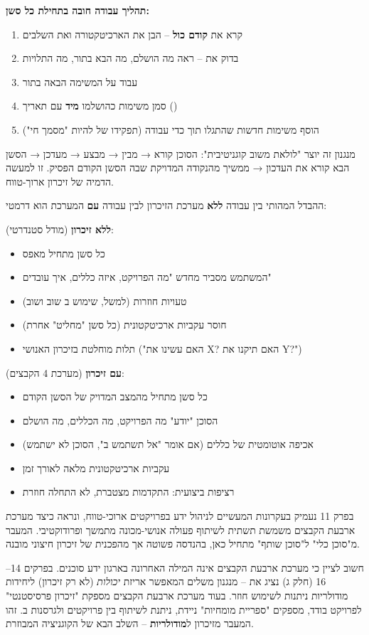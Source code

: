 \textbf{תהליך עבודה חובה בתחילת כל סשן:}
\begin{enumerate}
  \item קרא את  \textbf{קודם כול} – הבן את הארכיטקטורה ואת השלבים
  \item בדוק את  – ראה מה הושלם, מה הבא בתור, מה התלויות
  \item עבוד על המשימה הבאה בתור
  \item סמן משימות כהושלמו \textbf{מיד} עם תאריך ()
  \item הוסף משימות חדשות שהתגלו תוך כדי עבודה (תפקידו של  להיות "מסמך חי")
\end{enumerate}

מנגנון זה יוצר "לולאת משוב קוגניטיבית": הסוכן קורא → מבין → מבצע → מעדכן → הסשן הבא קורא את העדכון → ממשיך מהנקודה המדויקת שבה הסשן הקודם הפסיק. זו למעשה הדמיה של זיכרון ארוך-טווח.


ההבדל המהותי בין עבודה \textbf{ללא} מערכת הזיכרון לבין עבודה \textbf{עם} המערכת הוא דרמטי:

\textbf{ללא זיכרון} (מודל סטנדרטי):
\begin{itemize}
  \item כל סשן מתחיל מאפס
  \item המשתמש מסביר מחדש "מה הפרויקט, איזה כללים, איך עובדים"
  \item טעויות חוזרות (למשל, שימוש ב שוב ושוב)
  \item חוסר עקביות ארכיטקטונית (כל סשן "מחליט" אחרת)
  \item תלות מוחלטת בזיכרון האנושי ("האם עשינו את X? האם תיקנו את Y?")
\end{itemize}

\textbf{עם זיכרון} (מערכת \num{4} הקבצים):
\begin{itemize}
  \item כל סשן מתחיל מהמצב המדויק של הסשן הקודם
  \item הסוכן "יודע" מה הפרויקט, מה הכללים, מה הושלם
  \item אכיפה אוטומטית של כללים (אם  אומר "אל תשתמש ב", הסוכן לא ישתמש)
  \item עקביות ארכיטקטונית מלאה לאורך זמן
  \item רציפות ביצועית: התקדמות מצטברת, לא התחלה חוזרת
\end{itemize}

בפרק \num{11} נעמיק בעקרונות המעשיים לניהול ידע בפרויקטים ארוכי-טווח, ונראה כיצד מערכת ארבעת הקבצים משמשת תשתית לשיתוף פעולה אנושי-מכונה מתמשך ופרודוקטיבי. המעבר מ"סוכן כלי" ל"סוכן שותף" מתחיל כאן, בהנדסה פשוטה אך מהפכנית של זיכרון חיצוני מובנה.

חשוב לציין כי מערכת ארבעת הקבצים אינה המילה האחרונה בארגון ידע סוכנים. בפרקים \num{14}–\num{16} (חלק ג) נציג את \textbf{} – מנגנון משלים המאפשר אריזת \textit{יכולות} (לא רק זיכרון) ליחידות מודולריות ניתנות לשימוש חוזר. בעוד מערכת ארבעת הקבצים מספקת "זיכרון פרסיסטנטי" לפרויקט בודד,  מספקים "ספריית מומחיות" ניידת, ניתנת לשיתוף בין פרויקטים ולגרסנות ב. זהו המעבר מזיכרון ל\textbf{מודולריות} – השלב הבא של הקוגניציה המבוזרת.
